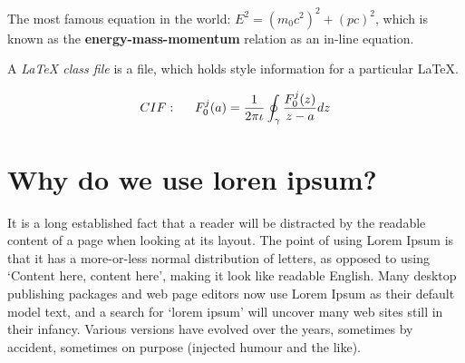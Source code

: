The most famous equation in the world: $E^2 = (m_0c^2)^2 + (pc)^2$, which is 
known as the \textbf{energy-mass-momentum} relation as an in-line equation.

A {\em \LaTeX{} class file} is a file, which holds style information for a particular \LaTeX{}.


\begin{align}
CIF: \hspace*{5mm}F_0^j(a) = \frac{1}{2\pi \iota} \oint_{\gamma} \frac{F_0^j(z)}{z - a} dz
\end{align}

\nomenclature[g-p]{$\pi$}{ $\simeq 3.14\ldots$}                                             %


\section{Why do we use loren ipsum?} %


It is a long established fact that a reader will be distracted by the readable content of a page when looking at its layout. The point of using Lorem Ipsum is that it has a more-or-less normal distribution of letters, as opposed to using `Content here, content here', making it look like readable English. Many desktop publishing packages and web page editors now use Lorem Ipsum as their default model text, and a search for `lorem ipsum' will uncover many web sites still in their infancy. Various versions have evolved over the years, sometimes by accident, sometimes on purpose (injected humour and the like).


